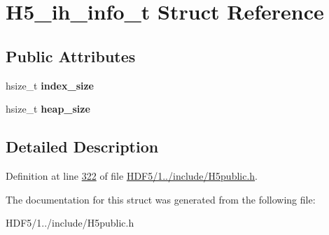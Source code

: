 \hypertarget{struct_h5__ih__info__t}{}\section{H5\+\_\+ih\+\_\+info\+\_\+t Struct Reference}
\label{struct_h5__ih__info__t}
\subsection*{Public Attributes}
\begin{DoxyCompactItemize}
\item 
\mbox{\label{struct_h5__ih__info__t_aab81a16ba5cf14cc4b78949750c10e63}} 
hsize\+\_\+t {\bfseries index\+\_\+size}
\item 
\mbox{\label{struct_h5__ih__info__t_a5d8cc2d042d0320889613d57cdd6046d}} 
hsize\+\_\+t {\bfseries heap\+\_\+size}
\end{DoxyCompactItemize}


\subsection{Detailed Description}


Definition at line \hyperlink{_h_d_f5_21_810_81_2include_2_h5public_8h_source_l00322}{322} of file \hyperlink{_h_d_f5_21_810_81_2include_2_h5public_8h_source}{H\+D\+F5/1../include/\+H5public.\+h}.



The documentation for this struct was generated from the following file\+:\begin{DoxyCompactItemize}
\item 
H\+D\+F5/1../include/\+H5public.\+h\end{DoxyCompactItemize}

